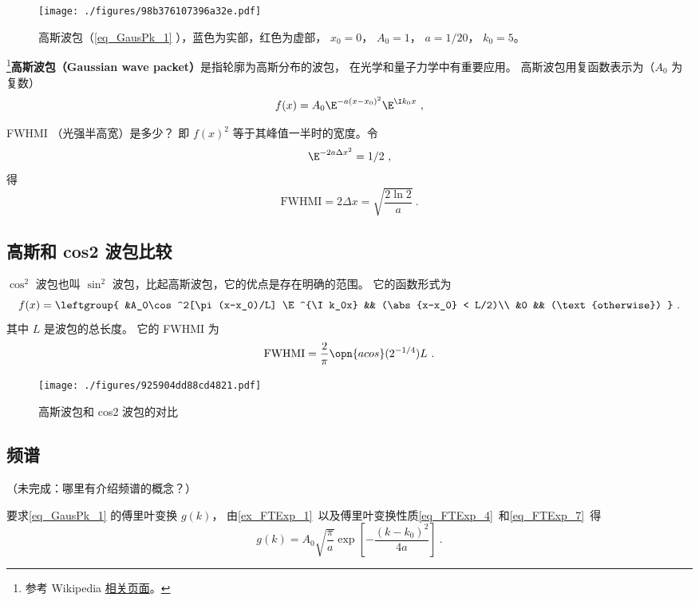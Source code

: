 
\begin{issues}
\issueDraft
\end{issues}


\begin{figure}[ht]
\centering
\texttt{[image: ./figures/98b376107396a32e.pdf]}
\caption{高斯波包（\autoref{eq_GausPk_1} ），蓝色为实部，红色为虚部， $x_0 = 0$， $A_0 = 1$， $a = 1/20$， $k_0 = 5$。} \label{fig_GausPk_1}
\end{figure}

\footnote{参考 Wikipedia \href{https://en.wikipedia.org/wiki/Wave_packet}{相关页面}。}\textbf{高斯波包（Gaussian wave packet）}是指轮廓为高斯分布的波包， 在光学和量子力学中有重要应用。 高斯波包用复函数表示为（$A_0$ 为复数）
\begin{equation}\label{eq_GausPk_1}
f(x) = A_0 \E^{-a(x-x_0)^2}\E^{\I k_0 x}~,
\end{equation}

FWHMI （光强半高宽）是多少？ 即 $f(x)^2$ 等于其峰值一半时的宽度。令
\begin{equation}
\E^{-2a\Delta x^2} = 1/2~,
\end{equation}
得
\begin{equation}
\mathrm{FWHMI} = 2\Delta x = \sqrt{\frac{2\ln 2}{a}}~.
\end{equation}

\subsection{高斯和 cos2 波包比较}
$\cos^2$ 波包也叫 $\sin^2$ 波包，比起高斯波包，它的优点是存在明确的范围。 它的函数形式为
\begin{equation}
f(x) = \leftgroup{
&A_0\cos^2[\pi(x-x_0)/L] \E^{\I k_0x} && (\abs{x-x_0} < L/2)\\
&0 && (\text{otherwise})
}~.
\end{equation}
其中 $L$ 是波包的总长度。 它的 FWHMI 为
\begin{equation}
\text{FWHMI} = \frac{2}{\pi}\opn{acos}(2^{-1/4}) L~.
\end{equation}


\begin{figure}[ht]
\centering
\texttt{[image: ./figures/925904dd88cd4821.pdf]}
\caption{高斯波包和 cos2 波包的对比} \label{fig_GausPk_2}
\end{figure}

\subsection{频谱}
（未完成：哪里有介绍频谱的概念？）

要求\autoref{eq_GausPk_1} 的傅里叶变换 $g(k)$， 由\autoref{ex_FTExp_1}~以及傅里叶变换性质\autoref{eq_FTExp_4}~和\autoref{eq_FTExp_7}~得
\begin{equation}
g(k) = A_0\sqrt{\frac{\pi}{a}} \exp[-\frac{(k-k_0)^2}{4a}]~.
\end{equation}
